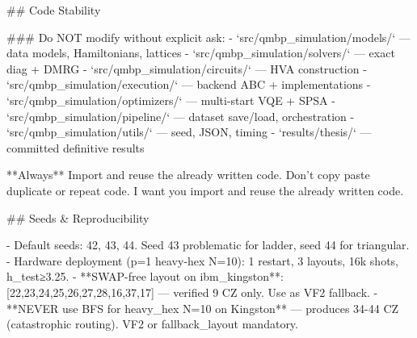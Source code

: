## Code Stability

### Do NOT modify without explicit ask:
- `src/qmbp_simulation/models/` — data models, Hamiltonians, lattices
- `src/qmbp_simulation/solvers/` — exact diag + DMRG
- `src/qmbp_simulation/circuits/` — HVA construction
- `src/qmbp_simulation/execution/` — backend ABC + implementations
- `src/qmbp_simulation/optimizers/` — multi-start VQE + SPSA
- `src/qmbp_simulation/pipeline/` — dataset save/load, orchestration
- `src/qmbp_simulation/utils/` — seed, JSON, timing
- `results/thesis/` — committed definitive results

**Always** Import and reuse the already written code. Don't copy paste duplicate or repeat code. I want you import and reuse the already written code.

## Seeds & Reproducibility

- Default seeds: 42, 43, 44. Seed 43 problematic for ladder, seed 44 for triangular.
- Hardware deployment (p=1 heavy-hex N=10): 1 restart, 3 layouts, 16k shots, h_test≥3.25.
- **SWAP-free layout on ibm_kingston**: [22,23,24,25,26,27,28,16,37,17] — verified 9 CZ only. Use as VF2 fallback.
- **NEVER use BFS for heavy_hex N=10 on Kingston** — produces 34-44 CZ (catastrophic routing). VF2 or fallback_layout mandatory.

